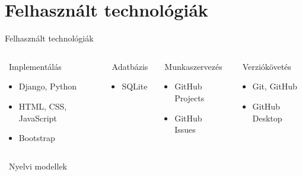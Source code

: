 \documentclass[aspectratio=169, 11pt]{beamer}
\begin{document}
\section{Felhasznált technológiák}
\begin{frame}{Felhasznált technológiák}
    \vspace{-1.5em}
    \begin{columns}[T]
      \begin{block}{\faCode~Implementálás}
        \small
        \begin{itemize}
          \item Django, Python
          \item HTML, CSS, JavaScript
          \item Bootstrap
        \end{itemize}
      \end{block}
      \vspace{-0.75em}
      \begin{block}{\faDatabase~Adatbázis}
        \small
        \begin{itemize}
          \item SQLite
        \end{itemize}
      \end{block}
      \begin{block}{\faTasks~Munkaszervezés}
        \small
        \begin{itemize}
          \item GitHub Projects
          \item GitHub Issues
        \end{itemize}
      \end{block}
      \vspace{-0.75em}
      \begin{block}{\faCodeBranch~Verziókövetés}
        \small
        \begin{itemize}
          \item Git, GitHub
          \item GitHub Desktop
        \end{itemize}
      \end{block}
    \end{columns}
    \vspace{0.25em}
    \begin{columns}[T]
    \begin{block}{\faRobot~Nyelvi modellek}
        \small

\end{block}
\end{columns}
\end{frame}
\end{document}
